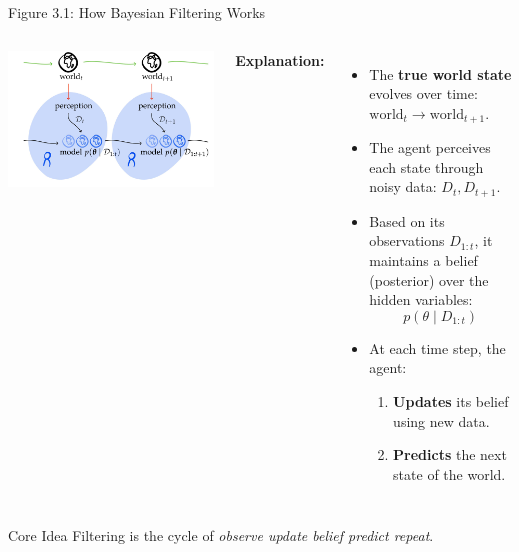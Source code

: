 \documentclass[handout,aspectratio=169]{beamer}
\begin{document}
\begin{frame}{Figure 3.1: How Bayesian Filtering Works}

\begin{columns}
\includegraphics[width=\linewidth]{chapter_figs/03_figs/3_1.png} 

\textbf{Explanation:}
\begin{itemize}
  \item The \textbf{true world state} evolves over time: \( \text{world}_t \to \text{world}_{t+1} \).
  \item The agent perceives each state through noisy data: \( D_t, D_{t+1} \).
  \item Based on its observations \( D_{1:t} \), it maintains a belief (posterior) over the hidden variables: 
  \[
  p(\theta \mid D_{1:t})
  \]
  \item At each time step, the agent:
  \begin{enumerate}
    \item \textbf{Updates} its belief using new data.
    \item \textbf{Predicts} the next state of the world.
  \end{enumerate}
\end{itemize}
\end{columns}

\begin{block}{Core Idea}
Filtering is the cycle of \textit{observe \rightarrow update belief \rightarrow  predict \rightarrow  repeat}.
\end{block}

\end{frame}
\end{document}
